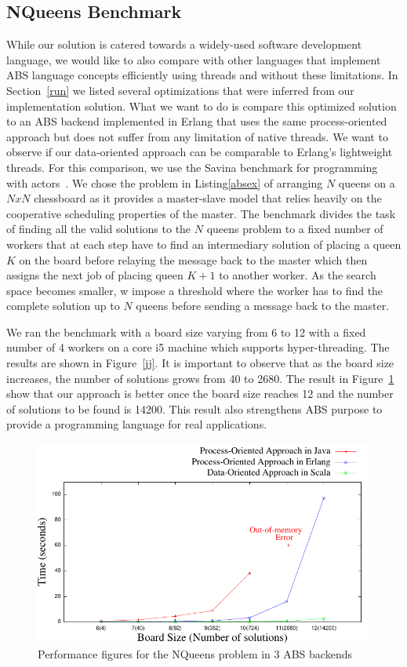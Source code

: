 \subsection{NQueens Benchmark}
\label{bench2}
\par While our solution is catered towards a widely-used software development language, we would like to also compare with other languages that implement ABS language concepts efficiently using threads and without these limitations. In Section~\ref{run} we listed several optimizations that were inferred from our implementation solution. What we want to do is compare this optimized solution to an ABS backend implemented in Erlang that uses the same process-oriented approach but does not suffer from any limitation of native threads. We want to observe if our data-oriented approach can be comparable to Erlang's lightweight threads. For this comparison, we use the Savina benchmark for programming with actors~\cite{savina}.  We chose the problem in Listing\ref{absex} of arranging $N$ queens on a $NxN$ chessboard as it provides a master-slave model that relies heavily on the cooperative scheduling properties of the master.  The benchmark divides the task of finding all the valid solutions to the $N$ queens problem to a fixed number of workers that at each step have to find an intermediary solution of placing a queen $K$ on the board before relaying the message back to the master which then assigns the next job of placing queen $K+1$ to another worker. As the search space becomes smaller, w impose a threshold where the worker has to find the complete solution up to $N$ queens before sending a message back to the master. 
\par We ran the benchmark with a board size varying from 6 to 12 with a fixed number of 4 workers on a core i5 machine which supports hyper-threading. The results are shown in Figure~\ref{jj}. It is important to observe that as the board size increases, the number of solutions grows from 40 to 2680. The result in Figure~\ref{ej} show that our approach is better once the board size reaches 12 and the number of solutions to be found is 14200. This result also strengthens ABS purpose to provide a programming language for real applications.

\begin{figure}
	\centering
	\includegraphics[scale=.7]{erlj8.pdf}
	\caption{Performance figures for the NQueens problem in 3 ABS backends}
	\label{ej}
\end{figure}

